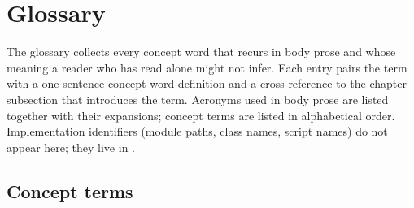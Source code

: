 
\chapter{Glossary}
\label{app:glossary}

The glossary collects every concept word that recurs in body prose and whose meaning a reader who has read  alone might not infer. Each entry pairs the term with a one-sentence concept-word definition and a cross-reference to the chapter subsection that introduces the term. Acronyms used in body prose are listed together with their expansions; concept terms are listed in alphabetical order. Implementation identifiers (module paths, class names, script names) do not appear here; they live in .

\section{Concept terms}

